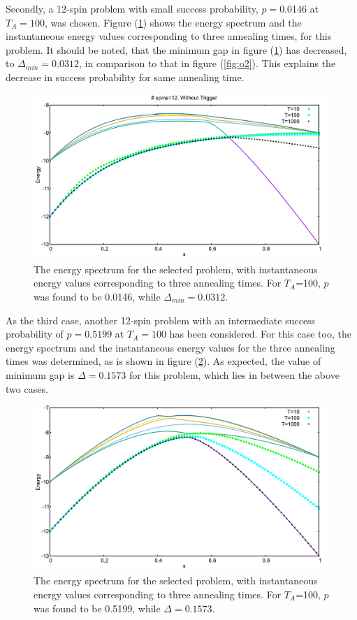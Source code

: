 \documentclass[12]{article}
\begin{document}
Secondly, a 12-spin problem with small success probability, $p= $0.0146 at $T_A=100$, was chosen. Figure (\ref{fig:o3}) shows the energy spectrum and the instantaneous energy values corresponding to three annealing times, for this problem. It should be noted, that the minimum gap in figure (\ref{fig:o3}) has decreased, to $\Delta_{min} = 0.0312$, in comparison to that in figure (\ref{fig:o2}). This explains the decrease in success probability for same annealing time.\\
\begin{figure}[H]
\centering 
\includegraphics[scale=0.3]{950_s12_O.png}
\caption{The energy spectrum for the selected problem, with instantaneous energy values corresponding to three annealing times. For $T_A$=100, $p$ was found to be 0.0146, while $\Delta_{min}=0.0312.$}
\label{fig:o3}
\end{figure}


As the third case, another 12-spin problem with an intermediate success probability of $p=0.5199$ at $T_A= 100$ has been considered. For this case too, the energy spectrum and the instantaneous energy values for the three annealing times was determined, as is shown in figure (\ref{fig:o4}). As expected, the value of minimum gap is $\Delta=0.1573$ for this problem, which lies in between the above two cases. 
\begin{figure}[H]
\centering 
\includegraphics[scale=0.3]{528_s12_O.png}
\caption{The energy spectrum for the selected problem, with instantaneous energy values corresponding to three annealing times. For $T_A$=100, $p$ was found to be 0.5199, while $\Delta=0.1573.$}
\label{fig:o4}
\end{figure}
\end{document}
